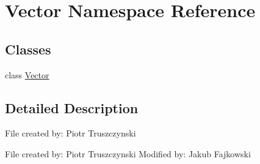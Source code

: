 \hypertarget{namespaceVector}{}\section{Vector Namespace Reference}
\label{namespaceVector}
\subsection*{Classes}
\begin{DoxyCompactItemize}
\item 
class \hyperlink{classVector_1_1Vector}{Vector}
\end{DoxyCompactItemize}


\subsection{Detailed Description}
\begin{DoxyVerb}File created by: Piotr Truszczynski
\end{DoxyVerb}


\begin{DoxyVerb}File created by: Piotr Truszczynski
Modified by: Jakub Fajkowski
\end{DoxyVerb}
 